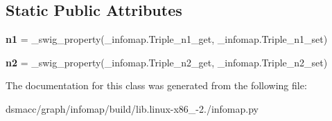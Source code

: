 \subsection*{Static Public Attributes}
\begin{DoxyCompactItemize}
\item 
\mbox{\label{classinfomap_1_1Triple_a761d298fd87def700931756cef3ab5ed}} 
{\bfseries n1} = \+\_\+swig\+\_\+property(\+\_\+infomap.\+Triple\+\_\+n1\+\_\+get, \+\_\+infomap.\+Triple\+\_\+n1\+\_\+set)
\item 
\mbox{\label{classinfomap_1_1Triple_a294e6d9561c9db7c7c2f77c601dde01c}} 
{\bfseries n2} = \+\_\+swig\+\_\+property(\+\_\+infomap.\+Triple\+\_\+n2\+\_\+get, \+\_\+infomap.\+Triple\+\_\+n2\+\_\+set)
\end{DoxyCompactItemize}


The documentation for this class was generated from the following file\+:\begin{DoxyCompactItemize}
\item 
dsmacc/graph/infomap/build/lib.\+linux-\/x86\+\_-\/2./infomap.\+py\end{DoxyCompactItemize}
